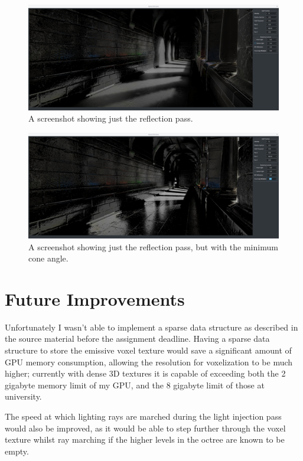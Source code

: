 \documentclass[]{acmsiggraph}
\begin{document}
\begin{figure}[htbp]\centering
 \includegraphics[width=1.0\linewidth]{images/reflection_only}
 \caption{A screenshot showing just the reflection pass.}
\end{figure}

\begin{figure}[htbp]\centering
 \includegraphics[width=1.0\linewidth]{images/reflection_only_no_roughness}
 \caption{A screenshot showing just the reflection pass, but with the minimum cone angle.}
\end{figure}

\section{Future Improvements} \label{section:improvements}

Unfortunately I wasn't able to implement a sparse data structure as described in the source material \cite{crassinneyretsainzgreeneisemann2011} before the assignment deadline. Having a sparse data structure to store the emissive voxel texture would save a significant amount of GPU memory consumption, allowing the resolution for voxelization to be much higher; currently with dense 3D textures it is capable of exceeding both the 2 gigabyte memory limit of my GPU, and the 8 gigabyte limit of those at university.

The speed at which lighting rays are marched during the light injection pass would also be improved, as it would be able to step further through the voxel texture whilst ray marching if the higher levels in the octree are known to be empty.
\end{document}
